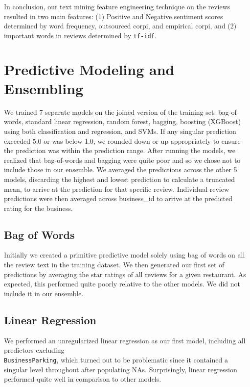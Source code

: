 \documentclass[10pt]{article}
\begin{document}
\noindent
In conclusion, our text mining feature engineering technique on the reviews resulted in two main features: (1) Positive and Negative sentiment scores determined by word frequency, outsourced corpi, and empirical corpi, and (2) important words in reviews determined by \texttt{tf-idf}.

\section{Predictive Modeling and Ensembling}

\noindent
We trained 7 separate models on the joined version of the training set: bag-of-words, standard linear regression, random forest, bagging, boosting (XGBoost) using both classification and regression, and SVMs. If any singular prediction exceeded 5.0 or was below 1.0, we rounded down or up appropriately to ensure the prediction was within the prediction range. After running the models, we realized that bag-of-words and bagging were quite poor and so we chose not to include those in our ensemble. We averaged the predictions across the other 5 models, discarding the highest and lowest prediction to calculate a truncated mean, to arrive at the prediction for that specific review. Individual review predictions were then averaged across business\_id to arrive at the predicted rating for the business.

\subsection{Bag of Words}
Initially we created a primitive predictive model solely using bag of words on all the review text in the training dataset. We then generated our first set of predictions by averaging the star ratings of all reviews for a given restaurant. As expected, this performed quite poorly relative to the other models. We did not include it in our ensemble.

\subsection{Linear Regression}
We performed an unregularized linear regression as our first model, including all predictors excluding \\ \texttt{BusinessParking}, which turned out to be problematic since it contained a singular level throughout after populating NAs. Surprisingly, linear regression performed quite well in comparison to other models.
\end{document}
